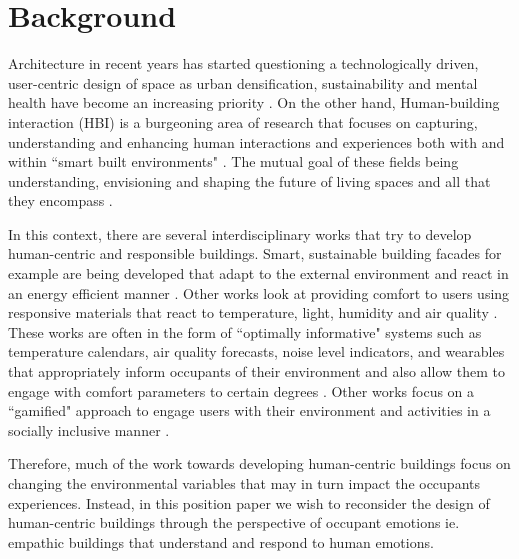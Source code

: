 \documentclass [sigconf, review, anonymous] {acmart}
\begin{document}



\section{Background}
Architecture in recent years has started questioning a technologically driven, user-centric design of space as urban densification, sustainability and mental health have become an increasing priority \cite{derix2014empathic}. On the other hand, Human-building interaction (HBI) is a burgeoning area of research that focuses on capturing, understanding and enhancing human interactions and experiences both with and within ``smart built environments" \cite{alavi2016future}. The mutual goal of these fields being  understanding,  envisioning and shaping the future of living spaces and all that they encompass \cite{nembrini2017human, alavi2018artifacts}. 

In this context, there are several interdisciplinary works that try to develop human-centric and responsible buildings. Smart, sustainable building facades for example are being developed that adapt to the external environment and react in an energy efficient manner \cite{ahmed2015development}. Other works look at providing comfort to users using responsive materials that react to temperature, light, humidity and air quality \cite{fragkia2020exergy, holstov2015hygromorphic}. These works are often in the form of ``optimally informative" systems such as temperature calendars, air quality forecasts, noise level indicators, and wearables that appropriately inform occupants of their environment and also allow them to engage with comfort parameters to certain degrees  \cite{costanza2016bit, kim2020designing}. Other works focus on a ``gamified" approach to engage users with their environment and activities in a socially inclusive manner \cite{mathur2015tiny, zhong2022augmenting}. 

Therefore, much of the work towards developing human-centric buildings focus on changing the environmental variables that may in turn impact the occupants experiences. Instead, in this position paper we wish to reconsider the design of human-centric buildings through the perspective of occupant emotions ie. empathic buildings that understand and respond to human emotions.
\end{document}
